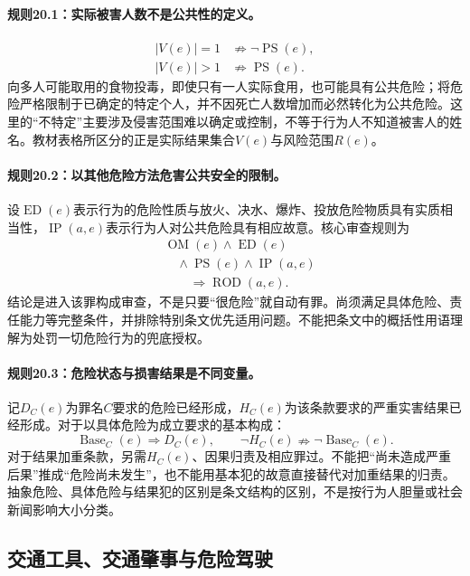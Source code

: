\paragraph{规则20.1：实际被害人数不是公共性的定义。}
\[
\begin{aligned}
|V(e)|=1&\nRightarrow\neg\operatorname{PS}(e),\\
|V(e)|>1&\nRightarrow\operatorname{PS}(e).
\end{aligned}
\]
向多人可能取用的食物投毒，即使只有一人实际食用，也可能具有公共危险；将危险严格限制于已确定的特定个人，并不因死亡人数增加而必然转化为公共危险。这里的“不特定”主要涉及侵害范围难以确定或控制，不等于行为人不知道被害人的姓名。教材表格所区分的正是实际结果集合$V(e)$与风险范围$R(e)$。

\paragraph{规则20.2：以其他危险方法危害公共安全的限制。}
设$\operatorname{ED}(e)$表示行为的危险性质与放火、决水、爆炸、投放危险物质具有实质相当性，$\operatorname{IP}(a,e)$表示行为人对公共危险具有相应故意。核心审查规则为
\[
\begin{aligned}
&\operatorname{OM}(e)\land\operatorname{ED}(e)\\
&\quad\land\operatorname{PS}(e)\land\operatorname{IP}(a,e)\\
&\qquad\Rightarrow\operatorname{ROD}(a,e).
\end{aligned}
\]
结论是进入该罪构成审查，不是只要“很危险”就自动有罪。尚须满足具体危险、责任能力等完整条件，并排除特别条文优先适用问题。不能把条文中的概括性用语理解为处罚一切危险行为的兜底授权。

\paragraph{规则20.3：危险状态与损害结果是不同变量。}
记$D_C(e)$为罪名$C$要求的危险已经形成，$H_C(e)$为该条款要求的严重实害结果已经形成。对于以具体危险为成立要求的基本构成：
\[
\operatorname{Base}_C(e)\Rightarrow D_C(e),\qquad
\neg H_C(e)\nRightarrow\neg\operatorname{Base}_C(e).
\]
对于结果加重条款，另需$H_C(e)$、因果归责及相应罪过。不能把“尚未造成严重后果”推成“危险尚未发生”，也不能用基本犯的故意直接替代对加重结果的归责。抽象危险、具体危险与结果犯的区别是条文结构的区别，不是按行为人胆量或社会新闻影响大小分类。

\subsection{交通工具、交通肇事与危险驾驶}
